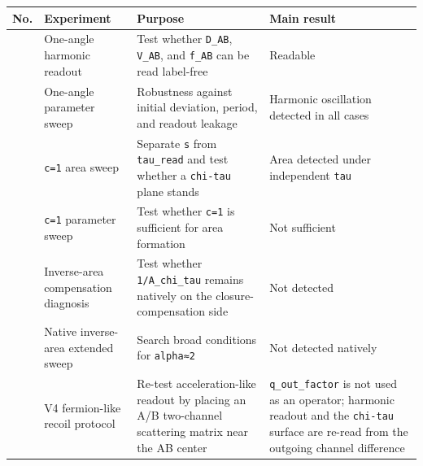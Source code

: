 \documentclass[
]{article}
\newcounter{none} %
\begin{document}
{\def\LTcaptype{none} %
\begin{longtable}[]{@{}
  >{\raggedleft\arraybackslash}p{}
  >{\raggedright\arraybackslash}p{}
  >{\raggedright\arraybackslash}p{}
  >{\raggedright\arraybackslash}p{}@{}}
\toprule\noalign{}
\begin{minipage}[b]{\linewidth}\raggedleft
No.
\end{minipage} & \begin{minipage}[b]{\linewidth}\raggedright
Experiment
\end{minipage} & \begin{minipage}[b]{\linewidth}\raggedright
Purpose
\end{minipage} & \begin{minipage}[b]{\linewidth}\raggedright
Main result
\end{minipage} \\
\midrule\noalign{}
\endhead
\bottomrule\noalign{}
\endlastfoot
1 & One-angle harmonic readout & Test whether \texttt{D\_AB},
\texttt{V\_AB}, and \texttt{f\_AB} can be read label-free & Readable \\
2 & One-angle parameter sweep & Robustness against initial deviation,
period, and readout leakage & Harmonic oscillation detected in all
cases \\
3 & \texttt{c=1} area sweep & Separate \texttt{s} from
\texttt{tau\_read} and test whether a \texttt{chi-tau} plane stands &
Area detected under independent \texttt{tau} \\
4 & \texttt{c=1} parameter sweep & Test whether \texttt{c=1} is
sufficient for area formation & Not sufficient \\
5 & Inverse-area compensation diagnosis & Test whether
\texttt{1/A\_chi\_tau} remains natively on the closure-compensation side
& Not detected \\
6 & Native inverse-area extended sweep & Search broad conditions for
\texttt{alpha≈2} & Not detected natively \\
7 & V4 fermion-like recoil protocol & Re-test acceleration-like readout
by placing an A/B two-channel scattering matrix near the AB center &
\texttt{q\_out\_factor} is not used as an operator; harmonic readout and
the \texttt{chi-tau} surface are re-read from the outgoing channel
difference \\
\end{longtable}
}
\end{document}

